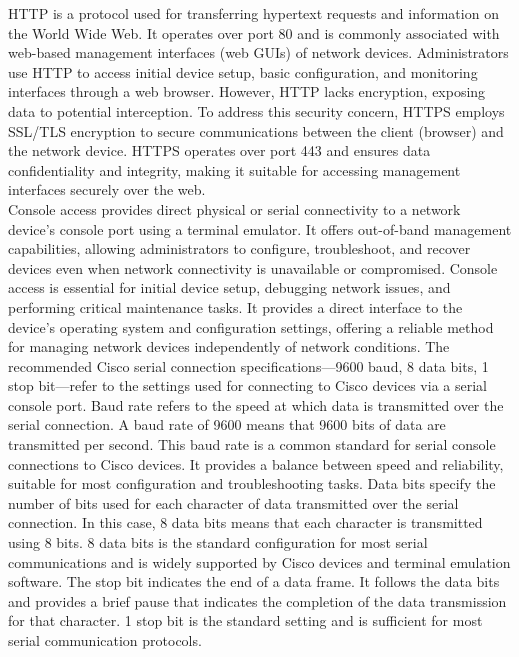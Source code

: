 \documentclass{article}
\begin{document}
	HTTP is a protocol used for transferring hypertext requests and information on the World Wide Web. It operates over port 80 and is commonly associated with web-based management interfaces (web GUIs) of network devices. Administrators use HTTP to access initial device setup, basic configuration, and monitoring interfaces through a web browser. However, HTTP lacks encryption, exposing data to potential interception. To address this security concern, HTTPS employs SSL/TLS encryption to secure communications between the client (browser) and the network device. HTTPS operates over port 443 and ensures data confidentiality and integrity, making it suitable for accessing management interfaces securely over the web.\\
	
	Console access provides direct physical or serial connectivity to a network device's console port using a terminal emulator. It offers out-of-band management capabilities, allowing administrators to configure, troubleshoot, and recover devices even when network connectivity is unavailable or compromised. Console access is essential for initial device setup, debugging network issues, and performing critical maintenance tasks. It provides a direct interface to the device's operating system and configuration settings, offering a reliable method for managing network devices independently of network conditions. The recommended Cisco serial connection specifications—9600 baud, 8 data bits, 1 stop bit—refer to the settings used for connecting to Cisco devices via a serial console port. Baud rate refers to the speed at which data is transmitted over the serial connection. A baud rate of 9600 means that 9600 bits of data are transmitted per second. This baud rate is a common standard for serial console connections to Cisco devices. It provides a balance between speed and reliability, suitable for most configuration and troubleshooting tasks. Data bits specify the number of bits used for each character of data transmitted over the serial connection. In this case, 8 data bits means that each character is transmitted using 8 bits. 8 data bits is the standard configuration for most serial communications and is widely supported by Cisco devices and terminal emulation software. The stop bit indicates the end of a data frame. It follows the data bits and provides a brief pause that indicates the completion of the data transmission for that character. 1 stop bit is the standard setting and is sufficient for most serial communication protocols.\\
	
\end{document}
